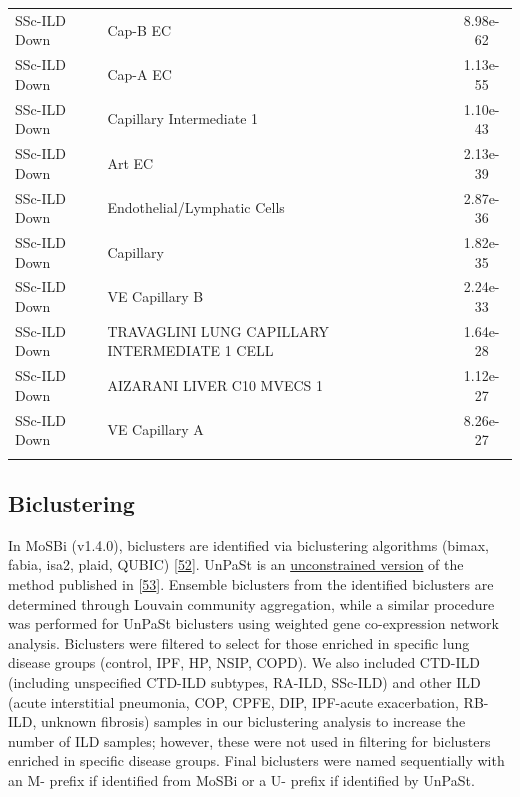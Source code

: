 \documentclass[
]{article}
\begin{document}
\begin{singlespace}
\begin{longtable}[t]{>{\raggedright\arraybackslash}p{0.8in}>{\raggedright\arraybackslash}p{4.5in}c}
\addlinespace
SSc-ILD Down & Cap-B EC & 8.98e-62\\
SSc-ILD Down & Cap-A EC & 1.13e-55\\
SSc-ILD Down & Capillary Intermediate 1 & 1.10e-43\\
SSc-ILD Down & Art EC & 2.13e-39\\
SSc-ILD Down & Endothelial/Lymphatic Cells & 2.87e-36\\
\addlinespace
SSc-ILD Down & Capillary & 1.82e-35\\
SSc-ILD Down & VE Capillary B & 2.24e-33\\
SSc-ILD Down & TRAVAGLINI LUNG CAPILLARY INTERMEDIATE 1 CELL & 1.64e-28\\
SSc-ILD Down & AIZARANI LIVER C10 MVECS 1 & 1.12e-27\\
SSc-ILD Down & VE Capillary A & 8.26e-27\\*
\end{longtable}
\endgroup{}

\end{singlespace}

\hypertarget{biclustering-1}{%
\subsection{Biclustering}\label{biclustering-1}}

In MoSBi (v1.4.0), biclusters are identified via biclustering algorithms (bimax, fabia, isa2, plaid, QUBIC) {[}\protect\hyperlink{ref-rose_mosbi_2022}{52}{]}. UnPaSt is an \href{https://github.com/ozolotareva/UnPaSt}{unconstrained version} of the method published in {[}\protect\hyperlink{ref-zolotareva_identification_2021}{53}{]}. Ensemble biclusters from the identified biclusters are determined through Louvain community aggregation, while a similar procedure was performed for UnPaSt biclusters using weighted gene co-expression network analysis. Biclusters were filtered to select for those enriched in specific lung disease groups (control, IPF, HP, NSIP, COPD). We also included CTD-ILD (including unspecified CTD-ILD subtypes, RA-ILD, SSc-ILD) and other ILD (acute interstitial pneumonia, COP, CPFE, DIP, IPF-acute exacerbation, RB-ILD, unknown fibrosis) samples in our biclustering analysis to increase the number of ILD samples; however, these were not used in filtering for biclusters enriched in specific disease groups. Final biclusters were named sequentially with an M- prefix if identified from MoSBi or a U- prefix if identified by UnPaSt.
\end{document}
